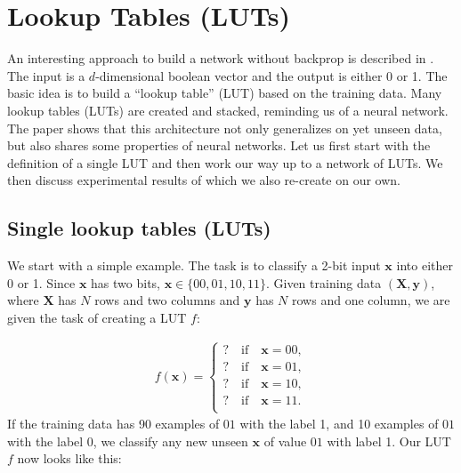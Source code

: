 \section{Lookup Tables (LUTs)}
An interesting approach to build a network without backprop is described in \cite{chatterjee2018learning}. The input is a $d$-dimensional boolean vector and the output is either 0 or 1. The basic idea is to build a \enquote{lookup table} (LUT) based on the training data. Many lookup tables (LUTs) are created and stacked, reminding us of a neural network. The paper shows that this architecture not only generalizes on yet unseen data, but also shares some properties of neural networks. Let us first start with the definition of a single LUT and then work our way up to a network of LUTs. We then discuss experimental results of \cite{chatterjee2018learning} which we also re-create on our own.

\subsection{Single lookup tables (LUTs)}
We start with a simple example. The task is to classify a 2-bit input $\bm{x}$ into either 0 or 1. Since $\bm{x}$ has two bits, $\bm{x} \in \{00, 01, 10, 11 \}$. Given training data $(\bm{X}, \bm{y})$, where $\bm{X}$ has $N$ rows and two columns and $\bm{y}$ has $N$ rows and one column, we are given the task of creating a LUT $f$:

\begin{align}
    f(\bm{x}) = \begin{cases}
        ? \quad \text{if} \quad \bm{x} = 00, \\
        ? \quad \text{if} \quad \bm{x} = 01, \\
        ? \quad \text{if} \quad \bm{x} = 10, \\
        ? \quad \text{if} \quad \bm{x} = 11. \\
    \end{cases}
\end{align} If the training data has 90 examples of $01$ with the label 1, and 10 examples of $01$ with the label 0, we classify any new unseen $\bm{x}$ of value $01$ with label 1. Our LUT $f$ now looks like this:

